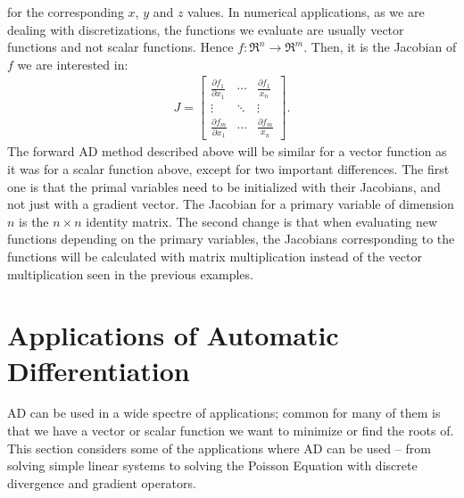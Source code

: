for the corresponding $x$, $y$ and $z$ values. In numerical applications, as we are dealing with discretizations, the functions we evaluate are usually  vector functions and not scalar functions. Hence $f: \Re^n \rightarrow \Re^m$. Then, it is the Jacobian of $f$ we are interested in:
\begin{align*}
    J  =
    \begin{bmatrix}
        \frac{\partial f_1}{\partial x_1} & \dotsb & \frac{\partial f_1}{x_n}\\
        \vdots & \ddots & \vdots \\
        \frac{\partial f_m}{\partial x_1} & \dotsb & \frac{\partial f_m}{x_n}
    \end{bmatrix}.
\end{align*}
The forward AD method described above will be similar for a vector function as it was for a scalar function above, except for two important differences. The first one is that the primal variables need to be initialized with their Jacobians, and not just with a gradient vector. The Jacobian for a primary variable of dimension $n$ is the $n \times n$ identity matrix. The second change is that when evaluating new functions depending on the primary variables, the Jacobians corresponding to the functions will be calculated with matrix multiplication instead of the vector multiplication seen in the previous examples. 

\section{Applications of Automatic Differentiation}
\label{sec:ApplicationsAD}
AD can be used in a wide spectre of applications; common for many of them is that we have a vector or scalar function we want to minimize or find the roots of. This section considers some of the applications where AD can be used -- from solving simple linear systems to solving the Poisson Equation with discrete divergence and gradient operators.

